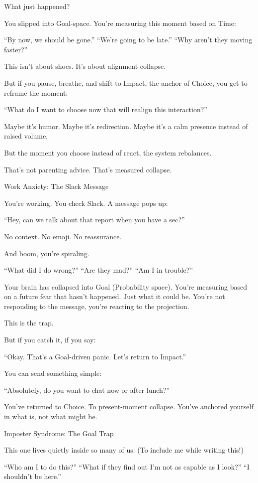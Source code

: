 \documentclass[11pt]{article}
\begin{document}
What just happened?

You slipped into Goal-space.
You’re measuring this moment based on Time:

“By now, we should be gone.”
“We’re going to be late.”
“Why aren’t they moving faster?”

This isn’t about shoes. It’s about alignment collapse.

But if you pause, breathe, and shift to Impact, the anchor of Choice, you get to reframe the moment:

“What do I want to choose now that will realign this interaction?”

Maybe it’s humor. Maybe it’s redirection. Maybe it’s a calm presence instead of raised volume.

But the moment you choose instead of react, the system rebalances.

That’s not parenting advice.
That’s measured collapse.

Work Anxiety: The Slack Message

You’re working. You check Slack. A message pops up:

“Hey, can we talk about that report when you have a sec?”

No context. No emoji. No reassurance.

And boom, you’re spiraling.

“What did I do wrong?”
“Are they mad?”
“Am I in trouble?”

Your brain has collapsed into Goal (Probability space).
You're measuring based on a future fear that hasn’t happened. Just what it could be. 
You’re not responding to the message, you’re reacting to the projection.

This is the trap.

But if you catch it, if you say:

“Okay. That’s a Goal-driven panic. Let’s return to Impact.”

You can send something simple:

“Absolutely, do you want to chat now or after lunch?”

You’ve returned to Choice. To present-moment collapse.
You’ve anchored yourself in what is, not what might be.

Imposter Syndrome: The Goal Trap

This one lives quietly inside so many of us: (To include me while writing this!)

“Who am I to do this?”
“What if they find out I’m not as capable as I look?”
“I shouldn’t be here.”
\end{document}
